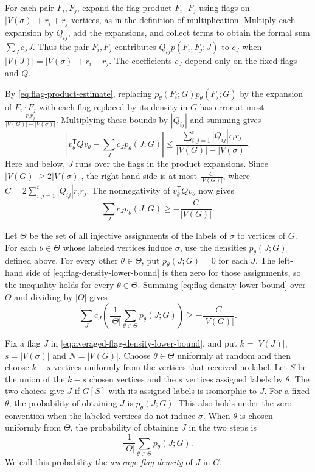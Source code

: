 For each pair $F_i,F_j$, expand the flag product $F_i\cdot F_j$
using flags on $|V(\sigma)|+r_i+r_j$ vertices, as in the definition
of multiplication. Multiply each expansion by $Q_{ij}$, add the
expansions, and collect terms to obtain the formal sum
$\sum_J c_JJ$. Thus the pair $F_i,F_j$ contributes
$Q_{ij}p(F_i,F_j;J)$ to $c_J$ when
$|V(J)|=|V(\sigma)|+r_i+r_j$. The coefficients $c_J$ depend only
on the fixed flags and $Q$.

By \eqref{eq:flag-product-estimate}, replacing
$p_\theta(F_i;G)p_\theta(F_j;G)$ by the expansion of
$F_i\cdot F_j$ with each flag replaced by its density in $G$
has error at most $\frac{r_ir_j}{|V(G)|-|V(\sigma)|}$.
Multiplying these bounds by $|Q_{ij}|$ and summing gives
\[
  \left|v_\theta^{\mathsf T}Qv_\theta
       -\sum_J c_Jp_\theta(J;G)\right|
  \leq
  \frac{\sum_{i,j=1}^{t}|Q_{ij}|r_ir_j}
       {|V(G)|-|V(\sigma)|}.
\]
Here and below, $J$ runs over the flags in the product
expansions. Since $|V(G)|\geq 2|V(\sigma)|$, the right-hand
side is at most $\frac{C}{|V(G)|}$, where
$C=2\sum_{i,j=1}^{t}|Q_{ij}|r_ir_j$. The nonnegativity of
$v_\theta^{\mathsf T}Qv_\theta$ now gives
\begin{equation}\label{eq:flag-density-lower-bound}
  \sum_J c_Jp_\theta(J;G)\geq-\frac{C}{|V(G)|}.
\end{equation}

Let $\Theta$ be the set of all injective assignments of the
labels of $\sigma$ to vertices of $G$. For each $\theta\in\Theta$
whose labeled vertices induce $\sigma$, use the densities
$p_\theta(J;G)$ defined above. For every other $\theta\in\Theta$,
put $p_\theta(J;G)=0$ for each $J$. The left-hand side of
\eqref{eq:flag-density-lower-bound} is then zero for those
assignments, so the inequality holds for every $\theta\in\Theta$.
Summing \eqref{eq:flag-density-lower-bound} over $\Theta$ and
dividing by $|\Theta|$ gives
\begin{equation}\label{eq:averaged-flag-density-lower-bound}
  \sum_J c_J
    \left(\frac{1}{|\Theta|}\sum_{\theta\in\Theta}p_\theta(J;G)\right)
  \geq -\frac{C}{|V(G)|}.
\end{equation}

Fix a flag $J$ in \eqref{eq:averaged-flag-density-lower-bound}, and
put $k=|V(J)|$, $s=|V(\sigma)|$ and $N=|V(G)|$. Choose
$\theta\in\Theta$ uniformly at random and then choose $k-s$ vertices
uniformly from the vertices that received no label. Let $S$ be
the union of the $k-s$ chosen vertices and the $s$ vertices
assigned labels by $\theta$. The two choices give $J$ if $G[S]$ with its assigned labels is
isomorphic to $J$. For a fixed $\theta$, the probability of
obtaining $J$ is $p_\theta(J;G)$. This also holds
under the zero convention when the labeled vertices do not
induce $\sigma$. When $\theta$ is chosen uniformly from $\Theta$,
the probability of obtaining $J$ in the two steps is
\[
  \frac{1}{|\Theta|}\sum_{\theta\in\Theta}p_\theta(J;G).
\]
We call this probability the \emph{average flag density} of $J$
in $G$.

